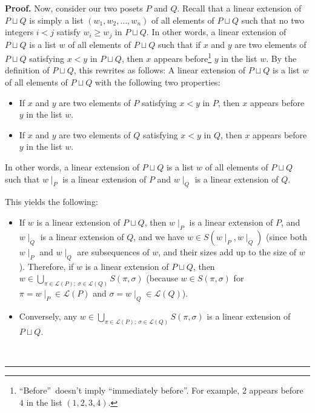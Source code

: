 \documentclass[numbers=enddot,12pt,final,onecolumn,notitlepage]{scrartcl}%
\theoremstyle{definition}
\newenvironment{proof}[1][Proof]{\noindent\textbf{#1.} }{\ \rule{0.5em}{0.5em}}
\newenvironment{verlong}{}{}
\begin{document}
\begin{verlong}
\begin{proof}
Now, consider our two posets $P$ and $Q$. Recall that a linear extension of
$P\sqcup Q$ is simply a list $\left(  w_{1},w_{2},\ldots,w_{n}\right)  $ of
all elements of $P\sqcup Q$ such that no two integers $i<j$ satisfy $w_{i}\geq
w_{j}$ in $P\sqcup Q$. In other words, a linear extension of $P\sqcup Q$ is a
list $w$ of all elements of $P\sqcup Q$ such that if $x$ and $y$ are two
elements of $P\sqcup Q$ satisfying $x<y$ in $P\sqcup Q$, then $x$ appears
before\footnote{\textquotedblleft Before\textquotedblright\ doesn't imply
\textquotedblleft immediately before\textquotedblright. For example, $2$
appears before $4$ in the list $\left(  1,2,3,4\right)  $.} $y$ in the list
$w$. By the definition of $P\sqcup Q$, this rewrites as follows: A linear
extension of $P\sqcup Q$ is a list $w$ of all elements of $P\sqcup Q$ with the
following two properties:

\begin{itemize}
\item If $x$ and $y$ are two elements of $P$ satisfying $x<y$ in $P$, then $x$
appears before $y$ in the list $w$.

\item If $x$ and $y$ are two elements of $Q$ satisfying $x<y$ in $Q$, then $x$
appears before $y$ in the list $w$.
\end{itemize}

In other words, a linear extension of $P\sqcup Q$ is a list $w$ of all elements
of $P\sqcup Q$ such that $w\mid_{P}$ is a linear extension of $P$ and
$w\mid_{Q}$ is a linear extension of $Q$.

This yields the following:

\begin{itemize}
\item If $w$ is a linear extension of $P\sqcup Q$, then $w\mid_{P}$ is a
linear extension of $P$, and $w\mid_{Q}$ is a linear extension of $Q$, and we
have $w\in S\left(  w\mid_{P},w\mid_{Q}\right)  $ (since both $w\mid_{P}$ and
$w\mid_{Q}$ are subsequences of $w$, and their sizes add up to the size of
$w$). Therefore, if $w$ is a linear extension of $P\sqcup Q$, then
$w\in\bigcup_{\pi\in\mathcal{L}\left(  P\right)  ;\ \sigma\in\mathcal{L}%
\left(  Q\right)  }S\left(  \pi,\sigma\right)  $ (because $w\in S\left(
\pi,\sigma\right)  $ for
$\pi = \left. w\mid_{P}\right. \in\mathcal{L}\left(  P\right)  $ and
$\sigma = \left. w\mid_{Q} \right. \in\mathcal{L}\left(  Q\right)  $).

\item Conversely, any $w\in\bigcup_{\pi\in\mathcal{L}\left(  P\right)
;\ \sigma\in\mathcal{L}\left(  Q\right)  }S\left(  \pi,\sigma\right)  $ is a
linear extension of $P\sqcup Q$.
\end{itemize}


\end{proof}
\end{verlong}
\end{document}
